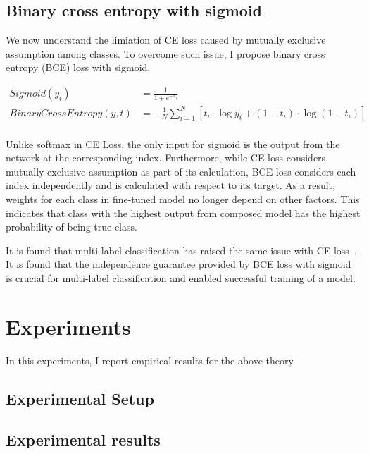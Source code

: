 \documentclass{article}
\begin{document}
\subsection{Binary cross entropy with sigmoid}

We now understand the limiation of CE loss caused by mutually exclusive assumption among classes. To overcome such issue, I propose binary cross entropy (BCE) loss with sigmoid.

\begin{align*}
Sigmoid(y_i) &= \frac{1}{1 + e^{-x_i}} \\
BinaryCrossEntropy(y, t) & = -\frac{1}{N}\sum_{i=1}^N \left[ t_i \cdot \log y_i + (1 - t_i) \cdot \log (1 - t_i) \right] \\
\end{align*}

Unlike softmax in CE Loss, the only input for sigmoid is the output from the network at the corresponding index. Furthermore, while CE loss considers mutually exclusive assumption as part of its calculation, BCE loss considers each index independently and is calculated with respect to its target. As a result, weights for each class in fine-tuned model no longer depend on other factors. This indicates that class with the highest output from composed model has the highest probability of being true class.

It is found that multi-label classification has raised the same issue with CE loss~\cite{liu2017deep}. It is found that the independence guarantee provided by BCE loss with sigmoid is crucial for multi-label classification and enabled successful training of a model.

\section{Experiments}

In this experiments, I report empirical results for the above theory

\subsection{Experimental Setup}




\subsection{Experimental results}
\end{document}
